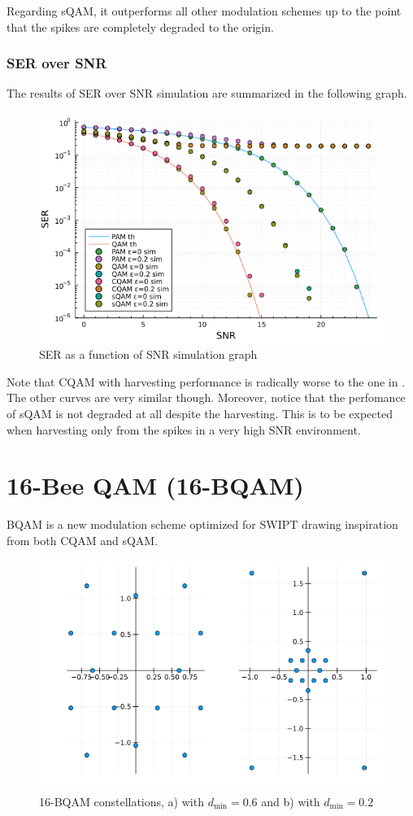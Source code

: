 \documentclass[11pt,a4paper,onecolumn,final]{article}
\newcommand{\dmin}{d_\text{min}}
\begin{document}
Regarding sQAM, it outperforms all other modulation schemes up to the point that the spikes are completely degraded to the origin. 

\newpage
\subsubsection*{SER over SNR}
The results of SER over SNR simulation are summarized in the following graph.  
\begin{figure}[h]
    \centering
    \includegraphics[scale=0.45]{ex2_b.png}
    \caption{SER as a function of SNR simulation graph}
\end{figure}

Note that CQAM with harvesting performance is radically worse to the one in \cite{cqam}. The other curves are very similar though. Moreover, notice that the perfomance of sQAM is not degraded at all despite the harvesting. This is to be expected when harvesting only from the spikes in a very high SNR environment. 

\section{16-Bee QAM (16-BQAM)}
BQAM is a new modulation scheme optimized for SWIPT drawing inspiration from both CQAM and sQAM. 
\begin{figure}[h]
    \centering
    \includegraphics[scale=0.57]{bqam_both.png}
    \caption{16-BQAM constellations, a) with \(\dmin = 0.6\) and b) with \(\dmin = 0.2\)}
\end{figure}
\end{document}
